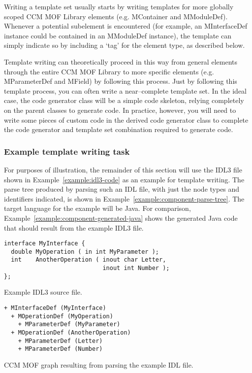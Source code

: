 Writing a template set usually starts by writing templates for more globally
scoped CCM MOF Library elements (e.g. MContainer and MModuleDef). Whenever a
potential subelement is encountered (for example, an MInterfaceDef instance
could be contained in an MModuleDef instance), the template can simply indicate
so by including a `tag' for the element type, as described below.

Template writing can theoretically proceed in this way from general elements
through the entire CCM MOF Library to more specific elements (e.g. MParameterDef
and MField) by following this process. Just by following this template process,
you can often write a near--complete template set. In the ideal case, the code
generator class will be a simple code skeleton, relying completely on the parent
classes to generate code. In practice, however, you will need to write some
pieces of custom code in the derived code generator class to complete the code
generator and template set combination required to generate code.

\subsubsection{Example template writing task}

For purposes of illustration, the remainder of this section will use the IDL3
file shown in Example~\ref{example:idl3-code} as an example for template
writing. The parse tree produced by parsing such an IDL file, with just the node
types and identifiers indicated, is shown in
Example~\ref{example:component-parse-tree}. The target language for the example
will be Java. For comparison, Example~\ref{example:component-generated-java}
shows the generated Java code that should result from the example IDL3 file.

\begin{Example}
\begin{minifbox}
\begin{verbatim}
interface MyInterface {
  double MyOperation ( in int MyParameter );
  int    AnotherOperation ( inout char Letter,
                            inout int Number );
};
\end{verbatim}
\caption{Example IDL3 source file.}
\label{example:component-idl3-code}
\end{minifbox}
\end{Example}

\begin{Example}
\begin{minifbox}
\begin{verbatim}
+ MInterfaceDef (MyInterface)
  + MOperationDef (MyOperation)
    + MParameterDef (MyParameter)
  + MOperationDef (AnotherOperation)
    + MParameterDef (Letter)
    + MParameterDef (Number)
\end{verbatim}
\end{minifbox}
\caption{CCM MOF graph resulting from parsing the example IDL file.}
\label{example:component-parse-tree}
\end{Example}

